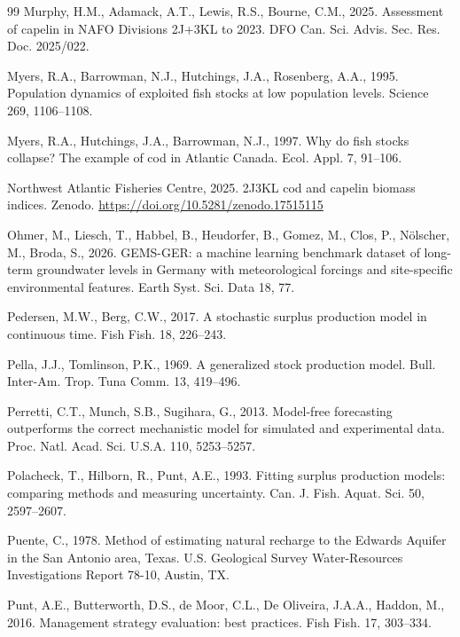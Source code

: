 \documentclass[preprint,11pt,authoryear]{elsarticle}
\theoremstyle{definition}
\theoremstyle{remark}
\begin{document}
\begin{thebibliography}{99}
Murphy, H.M., Adamack, A.T., Lewis, R.S., Bourne, C.M., 2025. Assessment of capelin in NAFO Divisions 2J+3KL to 2023. DFO Can. Sci. Advis. Sec. Res. Doc. 2025/022.

Myers, R.A., Barrowman, N.J., Hutchings, J.A., Rosenberg, A.A., 1995. Population dynamics of exploited fish stocks at low population levels. Science 269, 1106--1108.

Myers, R.A., Hutchings, J.A., Barrowman, N.J., 1997. Why do fish stocks collapse? The example of cod in Atlantic Canada. Ecol. Appl. 7, 91--106.

Northwest Atlantic Fisheries Centre, 2025. 2J3KL cod and capelin biomass indices. Zenodo. \url{https://doi.org/10.5281/zenodo.17515115}

Ohmer, M., Liesch, T., Habbel, B., Heudorfer, B., Gomez, M., Clos, P., N{\"o}lscher, M., Broda, S., 2026. GEMS-GER: a machine learning benchmark dataset of long-term groundwater levels in Germany with meteorological forcings and site-specific environmental features. Earth Syst. Sci. Data 18, 77.

Pedersen, M.W., Berg, C.W., 2017. A stochastic surplus production model in continuous time. Fish Fish. 18, 226--243.

Pella, J.J., Tomlinson, P.K., 1969. A generalized stock production model. Bull. Inter-Am. Trop. Tuna Comm. 13, 419--496.

Perretti, C.T., Munch, S.B., Sugihara, G., 2013. Model-free forecasting outperforms the correct mechanistic model for simulated and experimental data. Proc. Natl. Acad. Sci. U.S.A. 110, 5253--5257.

Polacheck, T., Hilborn, R., Punt, A.E., 1993. Fitting surplus production models: comparing methods and measuring uncertainty. Can. J. Fish. Aquat. Sci. 50, 2597--2607.

Puente, C., 1978. Method of estimating natural recharge to the Edwards Aquifer in the San Antonio area, Texas. U.S. Geological Survey Water-Resources Investigations Report 78-10, Austin, TX.

Punt, A.E., Butterworth, D.S., de Moor, C.L., De Oliveira, J.A.A., Haddon, M., 2016. Management strategy evaluation: best practices. Fish Fish. 17, 303--334.


\end{thebibliography}
\end{document}
